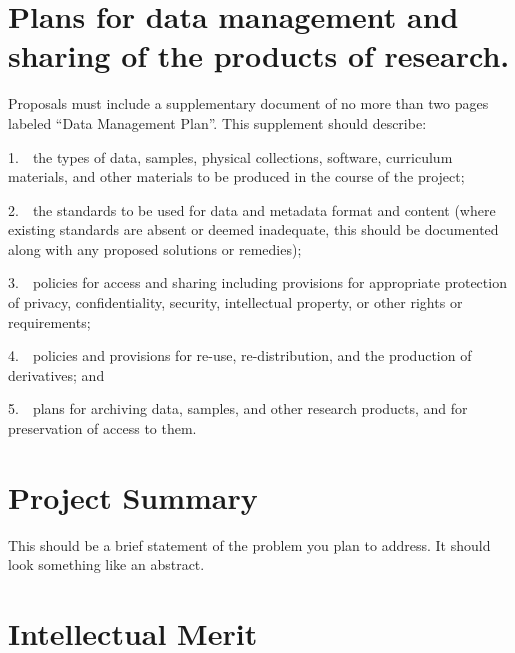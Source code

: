 \documentclass{proposalnsf}
\begin{document}


\renewcommand{\thepage} {\arabic{page}}





\section{Plans for data management and sharing of the products of research.}

Proposals must include a supplementary document of no more than
two pages labeled ``Data Management Plan''. This supplement should
describe:

\begin{list}
\item 1.~~the types of data, samples, physical collections, software, curriculum materials, and other materials to be produced in the course of the project;

\item 2.~~the standards to be used for data and metadata format and content (where existing standards are absent or deemed inadequate, this should be documented along with any proposed solutions or remedies);

\item 3.~~policies for access and sharing including provisions for appropriate protection of privacy, confidentiality, security, intellectual property, or other rights or requirements;

\item 4.~~policies and provisions for re-use, re-distribution, and the production of derivatives; and

\item 5.~~plans for archiving data, samples, and other research products, and for preservation of access to them.

\end{list}



\section{Project Summary}
This should be a brief statement of the problem you plan to address.
It should look something like an abstract. 

\section{Intellectual Merit}
\end{document}
